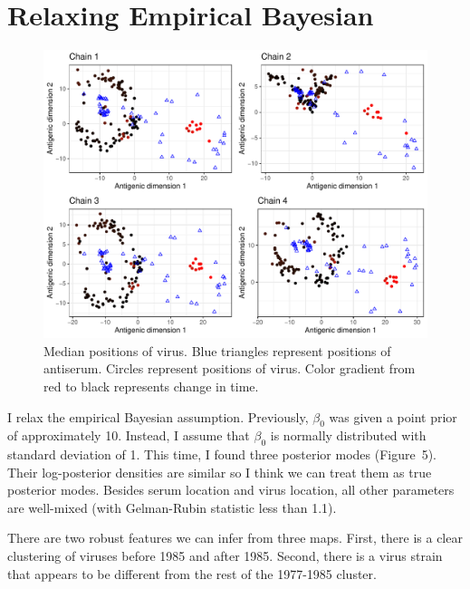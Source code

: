 \documentclass[12pt]{article}
\begin{document}
\section{Relaxing Empirical Bayesian}

\begin{figure}
\includegraphics[width=\textwidth]{../figure/h1n1_map_relax.pdf}
\caption{Median positions of virus. 
Blue triangles represent positions of antiserum.
Circles represent positions of virus. Color gradient from red to black represents change in time.
}
\end{figure}

I relax the empirical Bayesian assumption. Previously, $\beta_0$ was given a point prior of approximately 10. Instead, I assume that $\beta_0$ is normally distributed with standard deviation of 1.
This time, I found three posterior modes (Figure~5). Their log-posterior densities are similar so I think we can treat them as true posterior modes. 
Besides serum location and virus location, all other parameters are well-mixed (with Gelman-Rubin statistic less than 1.1).

There are two robust features we can infer from three maps. 
First, there is a clear clustering of viruses before 1985 and after 1985. 
Second, there is a virus strain that appears to be different from the rest of the 1977-1985 cluster.
\end{document}
